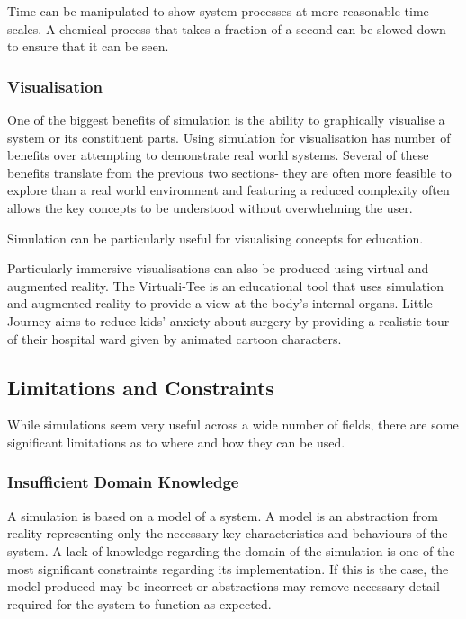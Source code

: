 \documentclass{UoYCSproject}
\begin{document}
Time can be manipulated to show system processes at more reasonable time scales. A chemical process that takes a fraction of a second can be slowed down to ensure that it can be seen.




\subsubsection{Visualisation}
One of the biggest benefits of simulation is the ability to graphically visualise a system or its constituent parts. Using simulation for visualisation has number of benefits over attempting to demonstrate real world systems. Several of these benefits translate from the previous two sections- they are often more feasible to explore than a real world environment and featuring a reduced complexity often allows the key concepts to be understood without overwhelming the user.

Simulation can be particularly useful for visualising concepts for education. 

Particularly immersive visualisations can also be produced using virtual and augmented reality. The Virtuali-Tee is an educational tool that uses simulation and augmented reality to provide a view at the body's internal organs\cite{curiscope}. Little Journey aims to reduce kids' anxiety about surgery by providing a realistic tour of their hospital ward given by animated cartoon characters\cite{little_journey}.

\subsection{Limitations and Constraints}
While simulations seem very useful across a wide number of fields, there are some significant limitations as to where and how they can be used.

\subsubsection{Insufficient Domain Knowledge}
\label{domain_knowledge}
A simulation is based on a model of a system. A model is an abstraction from reality representing only the necessary key characteristics and behaviours of the system. A lack of knowledge regarding the domain of the simulation is one of the most significant constraints regarding its implementation. If this is the case, the model produced may be incorrect or abstractions may remove necessary detail required for the system to function as expected.%
\end{document}
